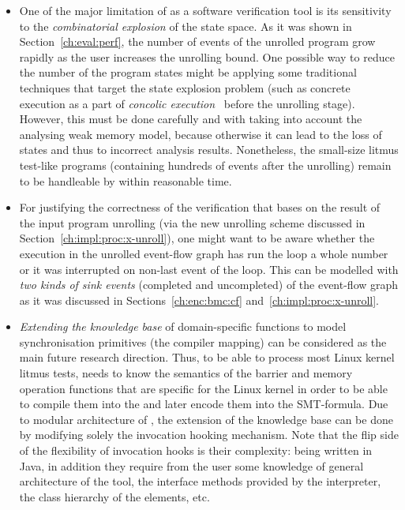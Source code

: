 \begin{itemize}[leftmargin=\parindent]
\item One of the major limitation of \porthos[2] as a software verification tool is its sensitivity to the \textit{combinatorial explosion} of the state space.
As it was shown in Section~\ref{ch:eval:perf}, the number of events of the unrolled program grow rapidly as the user increases the unrolling bound.
One possible way to reduce the number of the program states might be applying some traditional techniques that target the state explosion problem (such as concrete execution as a part of \textit{concolic execution}~\cite{majumdar2007hybrid} before the unrolling stage).
However, this must be done carefully and with taking into account the analysing weak memory model, because otherwise it can lead to the loss of states and thus to incorrect analysis results.
Nonetheless, the small-size litmus test-like programs (containing hundreds of events after the unrolling) remain to be handleable by \porthos[2] within reasonable time.


\item For justifying the correctness of the verification that bases on the result of the input program unrolling (via the new unrolling scheme discussed in Section~\ref{ch:impl:proc:x-unroll}), one might want to be aware whether the execution in the unrolled event-flow graph has run the loop a whole number or it was interrupted on non-last event of the loop.
This can be modelled with \textit{two kinds of sink events} (completed and uncompleted) of the event-flow graph as it was discussed in Sections~\ref{ch:enc:bmc:cf} and~\ref{ch:impl:proc:x-unroll}.

\item \textit{Extending the knowledge base} of domain-specific functions to model synchronisation primitives (the compiler mapping) can be considered as the main future research direction.
Thus, to be able to process most Linux kernel litmus tests, \porthos[2] needs to know the semantics of the barrier and memory operation functions that are specific for the Linux kernel in order to be able to compile them into the \xgraph{} and later encode them into the SMT-formula.
Due to modular architecture of \porthos[2], the extension of the knowledge base can be done by modifying solely the invocation hooking mechanism.
Note that the flip side of the flexibility of invocation hooks is their complexity: being written in Java, in addition they require from the user some knowledge of general architecture of the tool, the interface methods provided by the interpreter, the class hierarchy of the \xgraph{} elements, etc.


\end{itemize}
